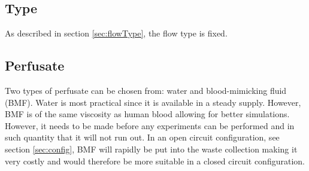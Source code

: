 \subsection*{Type}
As described in section \ref{sec:flowType}, the flow type is fixed.
\subsection*{Perfusate}
Two types of perfusate can be chosen from: water and blood-mimicking fluid (BMF). Water is most practical since it is available in a steady supply. However, BMF is of the same viscosity as human blood allowing for better simulations. However, it needs to be made before any experiments can be performed and in such quantity that it will not run out. In an open circuit configuration, see section \ref{sec:config}, BMF will rapidly be put into the waste collection making it very costly and would therefore be more suitable in a closed circuit configuration.

